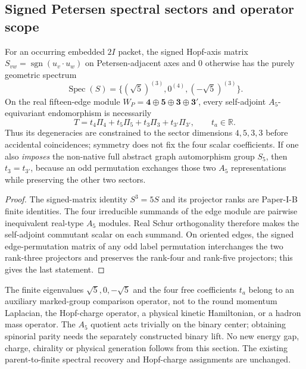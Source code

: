 \documentclass[12pt,a4paper]{article}
\begin{document}
\subsection{Signed Petersen spectral sectors and operator scope}
\label{p2d:sec:v318-petersen-spectral-types}
\begin{theorem}
\label{p2d:thm:v318-petersen-commutant-spectrum}
For an occurring embedded $2I$ packet, the signed Hopf-axis matrix
$S_{vw}=\operatorname{sgn}(u_v\cdot u_w)$ on Petersen-adjacent
axes and $0$ otherwise has the purely geometric spectrum
\[
 \operatorname{Spec}(S)=\{(\sqrt5)^{(3)},0^{(4)},
                             (-\sqrt5)^{(3)}\}.
\]
On the real fifteen-edge module
$W_P=\mathbf4\oplus\mathbf5\oplus\mathbf3\oplus\mathbf3'$, every
self-adjoint $A_5$-equivariant endomorphism is necessarily
\[
 \boxed{T=t_4\Pi_4+t_5\Pi_5+t_3\Pi_3+t_{3'}\Pi_{3'},
       \qquad t_a\in\mathbb R.}
\]
Thus its degeneracies are constrained to the sector dimensions
$4,5,3,3$ before accidental coincidences; symmetry does not fix
the four scalar coefficients.  If one also \emph{imposes} the
non-native full abstract graph automorphism group $S_5$, then
$t_3=t_{3'}$, because an odd permutation exchanges those two
$A_5$ representations while preserving the other two sectors.
\end{theorem}
\begin{proof}
The signed-matrix identity $S^3=5S$ and its projector ranks are
Paper-I-B finite identities.  The four irreducible summands of the
edge module are pairwise inequivalent real-type $A_5$ modules.
Real Schur orthogonality therefore makes the self-adjoint
commutant scalar on each summand.  On oriented edges, the
signed edge-permutation matrix of any odd label permutation
interchanges the two rank-three projectors and preserves the
rank-four and rank-five projectors; this gives the last statement.
\end{proof}

\begin{remark}
\label{p2d:rem:v318-petersen-energy-firewall}
The finite eigenvalues $\sqrt5,0,-\sqrt5$ and the four free
coefficients $t_a$ belong to an auxiliary marked-group comparison
operator, not to the round momentum Laplacian, the Hopf-charge
operator, a physical kinetic Hamiltonian, or a hadron mass operator.
The $A_5$ quotient acts trivially on the binary center; obtaining
spinorial parity needs the separately constructed binary lift.
No new energy gap, charge, chirality or physical generation follows
from this section.  The existing parent-to-finite spectral recovery
and Hopf-charge assignments are unchanged.
\end{remark}
\end{document}

